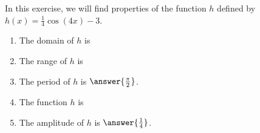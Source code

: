 \documentclass{ximera}
\author{Kenneth Berglund}
\begin{document}
\licenseSZ
\begin{exercise}
In this exercise, we will find properties of the function $h$ defined by $h(x) = \frac{1}{4}\cos(4x) - 3$.

\begin{enumerate}
\item The domain of $h$ is 
\begin{multipleChoice}
\choice{$(-\infty, 4] \cup [4, \infty)$.}
\end{multipleChoice}

\item The range of $h$ is 
\begin{multipleChoice}
\choice{$(- \infty, \infty)$}
\choice{$(-\infty, 4] \cup [4, \infty)$}
\end{multipleChoice}

\item The period of $h$ is $\answer{\frac{\pi}{2}}$.

\item The function $h$ is 
\begin{multipleChoice}
\end{multipleChoice}


\item The amplitude of $h$ is $\answer{\frac{1}{4}}$.
\end{enumerate}



\end{exercise}
\end{document}

